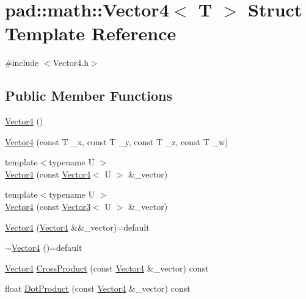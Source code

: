 \hypertarget{structpad_1_1math_1_1_vector4}{}\section{pad\+:\+:math\+:\+:Vector4$<$ T $>$ Struct Template Reference}
\label{structpad_1_1math_1_1_vector4}


{\ttfamily \#include $<$Vector4.\+h$>$}

\subsection*{Public Member Functions}
\begin{DoxyCompactItemize}
\item 
\mbox{\hyperlink{structpad_1_1math_1_1_vector4_a685f645bb73f9e7e2f0cfad10f8c9b3b}{Vector4}} ()
\item 
\mbox{\hyperlink{structpad_1_1math_1_1_vector4_a9ba6589a62f7635c2255c52c7b818aec}{Vector4}} (const T \+\_\+x, const T \+\_\+y, const T \+\_\+z, const T \+\_\+w)
\item 
{\footnotesize template$<$typename U $>$ }\\\mbox{\hyperlink{structpad_1_1math_1_1_vector4_a75987918337a3705cae46e39f4362433}{Vector4}} (const \mbox{\hyperlink{structpad_1_1math_1_1_vector4}{Vector4}}$<$ U $>$ \&\+\_\+vector)
\item 
{\footnotesize template$<$typename U $>$ }\\\mbox{\hyperlink{structpad_1_1math_1_1_vector4_a8eff662101e960939085ce8033f9ddae}{Vector4}} (const \mbox{\hyperlink{structpad_1_1math_1_1_vector3}{Vector3}}$<$ U $>$ \&\+\_\+vector)
\item 
\mbox{\hyperlink{structpad_1_1math_1_1_vector4_acc4699e8164a36ac16bac91357f8e7cd}{Vector4}} (\mbox{\hyperlink{structpad_1_1math_1_1_vector4}{Vector4}} \&\&\+\_\+vector)=default
\item 
\mbox{\hyperlink{structpad_1_1math_1_1_vector4_adf02f843943a3524de2add168b4d4903}{$\sim$\+Vector4}} ()=default
\item 
\mbox{\hyperlink{structpad_1_1math_1_1_vector4}{Vector4}} \mbox{\hyperlink{structpad_1_1math_1_1_vector4_a46ae48163a69e577092edb42b67ae84d}{Cross\+Product}} (const \mbox{\hyperlink{structpad_1_1math_1_1_vector4}{Vector4}} \&\+\_\+vector) const
\item 
float \mbox{\hyperlink{structpad_1_1math_1_1_vector4_aa2bc23659e5331ea63c4135ff4ba0cc5}{Dot\+Product}} (const \mbox{\hyperlink{structpad_1_1math_1_1_vector4}{Vector4}} \&\+\_\+vector) const

\end{DoxyCompactItemize}
